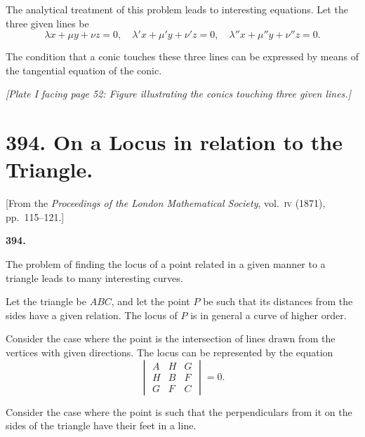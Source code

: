 \documentclass[11pt,a4paper]{article}
\theoremstyle{plain}
\begin{document}
The analytical treatment of this problem leads to interesting equations. Let the three given lines be
\begin{equation}
\lambda x + \mu y + \nu z = 0, \quad \lambda' x + \mu' y + \nu' z = 0, \quad \lambda'' x + \mu'' y + \nu'' z = 0.
\end{equation}

The condition that a conic touches these three lines can be expressed by means of the tangential equation of the conic.

\newpage

\textit{[Plate I facing page 52: Figure illustrating the conics touching three given lines.]}

\newpage

\section*{394. On a Locus in relation to the Triangle.}
\label{sec:394}
\begin{center}
[From the \textit{Proceedings of the London Mathematical Society}, vol.~\textsc{iv} (1871), pp.~115--121.]
\end{center}

\setcounter{equation}{0}

\textbf{394.}

The problem of finding the locus of a point related in a given manner to a triangle leads to many interesting curves.

Let the triangle be $ABC$, and let the point $P$ be such that its distances from the sides have a given relation. The locus of $P$ is in general a curve of higher order.

Consider the case where the point is the intersection of lines drawn from the vertices with given directions. The locus can be represented by the equation
\begin{equation}
\begin{vmatrix}
A & H & G \\
H & B & F \\
G & F & C
\end{vmatrix} = 0.
\end{equation}

\newpage
\setcounter{equation}{1}

Consider the case where the point is such that the perpendiculars from it on the sides of the triangle have their feet in a line.
\end{document}
